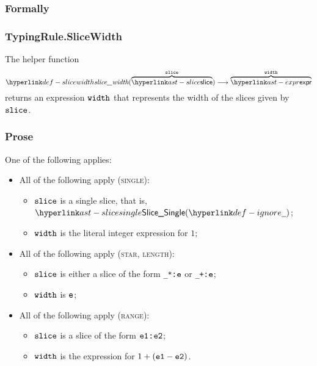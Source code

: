 \subsubsection{Formally}
\begin{mathpar}
\end{mathpar}

\begin{mathpar}
\end{mathpar}

\subsubsection{TypingRule.SliceWidth\label{sec:TypingRule.SliceWidth}}
\hypertarget{def-slicewidth}{}
The helper function
\[
  \slicewidth(\overname{\slice}{\vslice}) \aslto
  \overname{\expr}{\vwidth}
\]
returns an expression $\vwidth$ that represents the width of the slices given by $\vslice$.

\subsubsection{Prose}
One of the following applies:
\begin{itemize}
  \item All of the following apply (\textsc{single}):
  \begin{itemize}
    \item $\vslice$ is a single slice, that is, $\SliceSingle(\Ignore)$;
    \item $\vwidth$ is the literal integer expression for $1$;
  \end{itemize}

  \item All of the following apply (\textsc{star, length}):
  \begin{itemize}
    \item $\vslice$ is either a slice of the form \texttt{\_*:$\ve$} or \texttt{\_+:$\ve$};
    \item $\vwidth$ is $\ve$;
  \end{itemize}

  \item All of the following apply (\textsc{range}):
  \begin{itemize}
    \item $\vslice$ is a slice of the form \texttt{$\veone$:$\vetwo$};
    \item $\vwidth$ is the expression for $1 + (\veone - \vetwo)$.
  \end{itemize}
\end{itemize}
